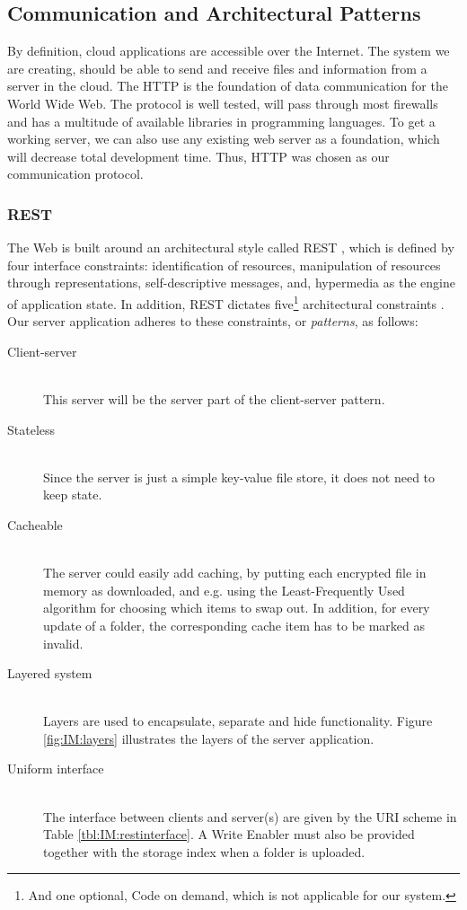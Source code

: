 \documentclass[pdftex,english,10pt,b5paper,twoside]{book}
\begin{document}
\subsection{Communication and Architectural Patterns}

By definition, cloud applications are accessible over the Internet. The system
we are creating, should be able to send and receive files and information from
a server in the cloud. The \acf{HTTP} is the foundation of data communication
for the World Wide Web. The protocol is well tested, will pass through most
firewalls and has a multitude of available libraries in programming languages.
To get a working server, we can also use any existing web server as a
foundation, which will decrease total development time. Thus, \ac{HTTP} was
chosen as our communication protocol.

\subsubsection{\acs{REST}} The Web is built around an architectural style called
\ac{REST} \cite[ch. 5]{fielding}, which is defined by four interface
constraints: identification of resources, manipulation of resources through
representations, self-descriptive messages, and, hypermedia as the engine of
application state. In addition, \ac{REST} dictates five\footnote{And one
optional, Code on demand, which is not applicable for our system.} architectural
constraints \cite{fielding}. Our server application adheres to these
constraints, or \emph{patterns}, as follows:

\begin{description}
  \item[Client-server] \hfill \\
    This server will be the server part of the client-server pattern.

  \item[Stateless] \hfill \\
    Since the server is just a simple key-value file store, it does
    not need to keep state.

  \item[Cacheable] \hfill \\
    The server could easily add caching, by putting each encrypted file in
    memory as downloaded, and e.g. using the Least-Frequently Used algorithm for
    choosing which items to swap out. In addition, for every update of a folder,
    the corresponding cache item has to be marked as invalid.

  \item[Layered system] \hfill \\
    Layers are used to encapsulate, separate and hide functionality.
    Figure \ref{fig:IM:layers} illustrates the layers of the server application.

  \item[Uniform interface] \hfill \\
    The interface between clients and server(s) are given by the URI scheme in
    Table \ref{tbl:IM:restinterface}. A Write Enabler
    must also be provided together with the storage index when a folder is
    uploaded.
\end{description}
\end{document}
